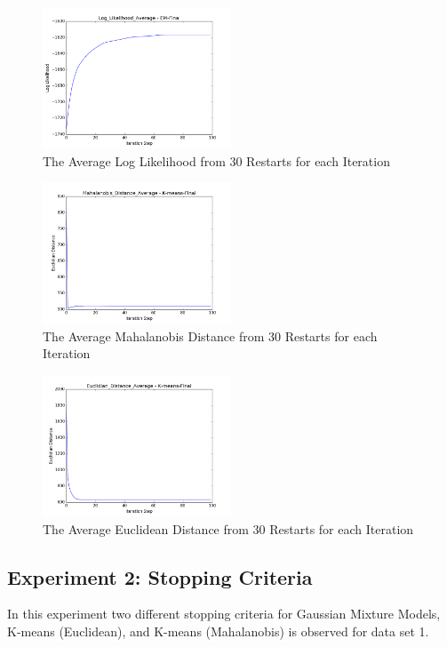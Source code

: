 \documentclass[conference]{IEEEtran}
\begin{document}
 
\begin{figure}[h]
  \includegraphics[width=0.5\textwidth]{experiment_1_log_likelihood_data1.png}
  \caption{The Average Log Likelihood from 30 Restarts for each Iteration}
  \label{fig:ex_1a_log}
\end{figure}

\begin{figure}[h]
  \includegraphics[width=0.5\textwidth]{experiment_1_mahalanobis_data1.png}
  \caption{The Average Mahalanobis Distance from 30 Restarts for each Iteration}
  \label{fig:ex_1a_maha}
\end{figure}

\begin{figure}[h]
  \includegraphics[width=0.5\textwidth]{experiment_1_euclidean_data1.png}
  \caption{The Average Euclidean Distance from 30 Restarts for each Iteration}
  \label{fig:ex_1a_eucl}
\end{figure}



\subsection{Experiment 2: Stopping Criteria}
In this experiment two different stopping criteria for Gaussian Mixture Models, K-means (Euclidean), and K-means (Mahalanobis) is observed for data set 1.
\end{document}
